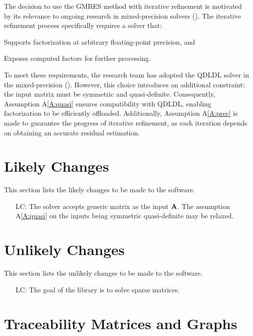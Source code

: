 \documentclass[12pt]{article}
\newcommand{\aref}[1]{A\ref{#1}}
\newcounter{lcnum} %
\begin{document}
The decision to use the GMRES method with iterative refinement is motivated by
its relevance to ongoing research in mixed-precision solvers
(\cite{bassi_investigating_2022}). The iterative refinement process specifically
requires a solver that:
\begin{enumerate*}[a)]
\item Supports factorization at arbitrary floating-point precision, and
\item Exposes computed factors for further processing.
\end{enumerate*}
To meet these requirements, the research team has adopted the QDLDL solver in
the mixed-precision (\cite{shahrooz_derakhshan_using_2023}). However, this
choice introduces an additional constraint: the input matrix must be symmetric
and quasi-definite. Consequently, Assumption \aref{A:quasi} ensures
compatibility with QDLDL, enabling factorization to be efficiently offloaded.
Additionally, Assumption \aref{A:prec} is made to guarantee the progress of
iterative refinement, as each iteration depends on obtaining an accurate
residual estimation.

\section{Likely Changes}

This section lists the likely changes to be made to the software.

\begin{itemize}
\item[LC\refstepcounter{lcnum}\thelcnum\label{LC:generic}:] The solver accepts
  generic matrix as the input \(\mathbf{A}\). The assumption \aref{A:quasi} on the
  inputs being symmetric quasi-definite may be relaxed.
\end{itemize}

\section{Unlikely Changes}

This section lists the unlikely changes to be made to the software.

\begin{itemize}
\item[LC\refstepcounter{lcnum}\thelcnum\label{LC:sparse}:] The goal of the library is
  to solve sparse matrices.
\end{itemize}

\section{Traceability Matrices and Graphs}
\end{document}
